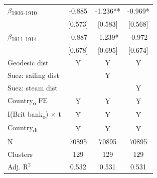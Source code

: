 {\begin{tabular}{l*{3}{c}}
$\beta$\textsubscript{1906-1910}&      -0.885   &      -1.236** &      -0.969*  \\
            &     [0.573]   &     [0.583]   &     [0.568]   \\
$\beta$\textsubscript{1911-1914}&      -0.887   &      -1.239*  &      -0.972   \\
            &     [0.678]   &     [0.695]   &     [0.674]   \\
Geodesic dist&           Y   &           Y   &           Y   \\
Suez: sailing dist&               &           Y   &               \\
Suez: steam dist&               &               &           Y   \\
Country\textsubscript{o} FE&           Y   &           Y   &           Y   \\
I(Brit bank\textsubscript{o}) $\times$ t&           Y   &           Y   &           Y   \\
Country\textsubscript{dt}&           Y   &           Y   &           Y   \\
\midrule
N           &       70895   &       70895   &       70895   \\
Clusters    &         129   &         129   &         129   \\
Adj. R{$^2$}&       0.532   &       0.531   &       0.531   \\
\bottomrule
\end{tabular}
}
